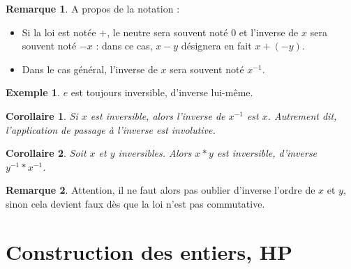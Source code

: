 \documentclass[french]{book}
\newcommand{\inv}{^{-1}}
\theoremstyle{plain}
\newtheorem{cor}{Corollaire}[chapter]
\theoremstyle{definition}
\newtheorem{exa}{Exemple}[chapter]
\newtheorem{rmq}{Remarque}[chapter]
\theoremstyle{remark}
\begin{document}
\begin{rmq}
	A propos de la notation :
	\begin{itemize}
		\item Si la loi est notée $+$, le neutre sera souvent noté $0$ et l'inverse de $x$ sera souvent noté $-x$ : dans ce cas, $x-y$ désignera en fait $x+(-y)$.
		\item Dans le cas général, l'inverse de $x$ sera souvent noté $x\inv$.
	\end{itemize}
\end{rmq}
\begin{exa}
	$e$ est toujours inversible, d'inverse lui-même.
\end{exa}
\begin{cor}
	Si $x$ est inversible, alors l'inverse de $x\inv$ est $x$. Autrement dit, l'application de passage à l'inverse est involutive.
\end{cor}
\begin{cor}
	Soit $x$ et $y$ inversibles. Alors $x*y$ est inversible, d'inverse $y\inv *x\inv$.
\end{cor}
\begin{rmq}
	Attention, il ne faut alors pas oublier d'inverse l'ordre de $x$ et $y$, sinon cela devient faux dès que la loi n'est pas commutative.
\end{rmq}
\section{Construction des entiers, HP}
\end{document}
